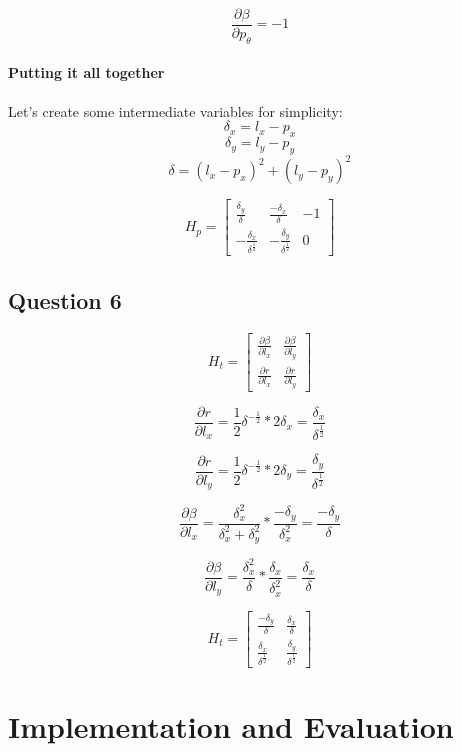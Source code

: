 \documentclass[12pt, a4paper]{article}
\begin{document}
$$\frac{\partial \beta}{\partial p_{\theta}} = -1$$

\paragraph{Putting it all together}

Let's create some intermediate variables for simplicity:
$$\delta_x = l_x - p_x$$
$$\delta_y = l_y - p_y$$
$$\delta = (l_x - p_x)^2 + (l_y - p_y)^2$$


$$H_p = 
\begin{bmatrix}
    \frac{\delta_y}{\delta} & \frac{-\delta_x}{\delta} & -1 \\
    -\frac{\delta_x}{\delta^{\frac{1}{2}}} & -\frac{\delta_y}{\delta^{\frac{1}{2}}}  & 0
    
\end{bmatrix}$$

\clearpage
\subsection{Question 6}

$$H_t = 
\begin{bmatrix}
    \frac{\partial \beta}{\partial l_x} & \frac{\partial \beta}{\partial l_y} \\
    \frac{\partial r}{\partial l_x} & \frac{\partial r}{\partial l_y}
    
\end{bmatrix}$$

$$\frac{\partial r}{\partial l_x} = \frac{1}{2} \delta^{-\frac{1}{2}} * 2\delta_x = \frac{\delta_x}{\delta^{\frac{1}{2}}}$$

$$\frac{\partial r}{\partial l_y} = \frac{1}{2} \delta^{-\frac{1}{2}} * 2\delta_y = \frac{\delta_y}{\delta^{\frac{1}{2}}}$$

$$\frac{\partial \beta}{\partial l_x} = \frac{\delta_x^2}{\delta_x^2 + \delta_y^2} * \frac{-\delta_y}{\delta_x^2} = \frac{-\delta_y}{\delta}$$

$$\frac{\partial \beta}{\partial l_y} = \frac{\delta_x^2}{\delta} * \frac{\delta_x}{\delta_x^2} = \frac{\delta_x}{\delta}$$

$$H_t = 
\begin{bmatrix}
    \frac{-\delta_y}{\delta} & \frac{\delta_x}{\delta} \\
    \frac{\delta_x}{\delta^{\frac{1}{2}}} &  \frac{\delta_y}{\delta^{\frac{1}{2}}}
\end{bmatrix}$$

\clearpage
\section{Implementation and Evaluation}
\end{document}
